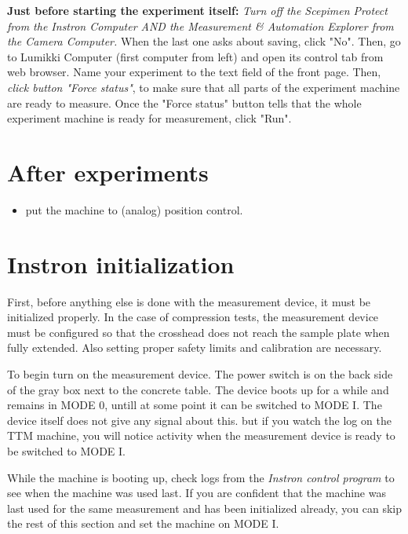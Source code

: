 \documentclass[a4paper]{article}
\begin{document}
\textbf{Just before starting the experiment itself:} \emph{Turn off the Scepimen Protect from the Instron Computer AND the Measurement \& Automation Explorer from the Camera Computer.} When the last one asks about saving, click "No". Then, go to Lumikki Computer (first computer from left) and open its control tab from web browser. Name your experiment to the text field of the front page. Then, \emph{click button "Force status"}, to make sure that all parts of the experiment machine are ready to measure. Once the "Force status" button tells that the whole experiment machine is ready for measurement, click "Run".

\section{After experiments}

\begin{itemize}
  \item put the machine to (analog) position control.
\end{itemize}


\section{Instron initialization}

First, before anything else is done with the measurement device, it
must be initialized properly. In the case of compression tests, the
measurement device must be configured so that the crosshead does not
reach the sample plate when fully extended. Also setting proper safety
limits and calibration are necessary.


To begin turn on the measurement device. The power switch is on the
back side of the gray box next to the concrete table. The device boots
up for a while and remains in \textsf{MODE 0}, untill at some point it
can be switched to \textsf{MODE I}. The device itself does not give
any signal about this. but if you watch the log on the TTM machine,
you will notice activity when the measurement device is ready to be
switched to \textsf{MODE I}.

While the machine is booting up, check logs from the {\it Instron
control program} to see when the machine was used last. If you are
confident that the machine was last used for the same measurement and
has been initialized already, you can skip the rest of this section
and set the machine on \textsf{MODE I}.
\end{document}
